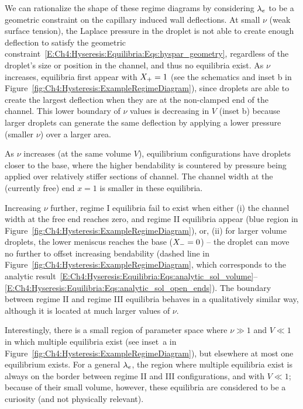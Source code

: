 We can rationalize the shape of these regime diagrams by considering $\lambda_e$ to be a geometric constraint on the capillary induced wall deflections. At small $\nu$ (weak surface tension), the Laplace pressure in the droplet is not able to create enough deflection to satisfy the geometric constraint~\eqref{E:Ch4:Hyseresis:Equilibria:Eqs:hyspar_geometry}, regardless of the droplet's size or position in the channel, and thus no equilibria exist. As $\nu$ increases, equilibria first appear with $X_{+} = 1$ (see the schematics and inset b in Figure~\ref{fig:Ch4:Hysteresis:ExampleRegimeDiagram}),  since droplets are able to create the largest deflection when they are at the non-clamped end of the channel. This lower boundary of $\nu$ values is decreasing in $V$ (inset b) because larger droplets can generate the same deflection by applying a lower pressure (smaller $\nu$) over a larger area.

As $\nu$ increases (at the same volume $V$), equilibrium configurations have droplets closer to the base, where the higher bendability is countered by pressure being applied over relatively stiffer sections of channel. The channel width at the (currently free) end $x = 1$ is smaller in these equilibria.

Increasing $\nu$ further, regime I equilibria fail to exist when either (i) the channel width at the free end reaches zero, and regime II equilibria appear (blue region in Figure~\ref{fig:Ch4:Hysteresis:ExampleRegimeDiagram}), or, (ii) for larger volume droplets, the lower meniscus reaches the base ($X_{-} = 0$) -- the droplet can move no further to offset increasing bendability (dashed line in Figure~\ref{fig:Ch4:Hysteresis:ExampleRegimeDiagram}, which corresponds to the analytic result~\eqref{E:Ch4:Hyseresis:Equilibria:Eqs:analytic_sol_volume}--\eqref{E:Ch4:Hyseresis:Equilibria:Eqs:analytic_sol_open_ends}). The boundary between regime II and regime III equilibria behaves in a qualitatively similar way, although it is located at much larger values of $\nu$.


Interestingly, there is a small region  of parameter space where $\nu \gg 1$ and $V \ll 1$ in which multiple equilibria exist (see inset~a in Figure~\ref{fig:Ch4:Hysteresis:ExampleRegimeDiagram}), but elsewhere at most one equilibrium exists. For a general $\lambda_e$, the region where multiple equilibria exist is always on the border between regime II and III configurations, and with $V \ll 1$;  because of their small volume, however, these equilibria are considered to be a curiosity (and not physically relevant).

